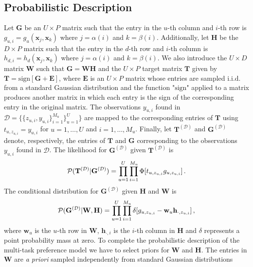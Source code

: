 \subsection{Probabilistic Description}

Let $\mathbf{G}$ be an $U\times P$ matrix such that the entry in the $u$-th column and $i$-th row is 
$g_{u,i}= g_u(\mathbf{x}_j,\mathbf{x}_k)$ where $j=\alpha(i)$ and $k=\beta(i)$.
Additionally, let $\mathbf{H}$ be the $D\times P$ matrix such that the entry in the $d$-th row and $i$-th column is 
$h_{d,i}= h_d(\mathbf{x}_j,\mathbf{x}_k)$ where $j=\alpha(i)$ and $k=\beta(i)$.
We also introduce the $U \times D$ matrix $\mathbf{W}$ such that $\mathbf{G} = \mathbf{W} \mathbf{H}$ and
the $U\times P$ target matrix $\mathbf{T}$ given by $\mathbf{T} = \text{sign}[\mathbf{G} + \mathbf{E}]$,
where $\mathbf{E}$ is an $U \times P$ matrix whose entries are sampled i.i.d. from a standard Gaussian distribution and
the function "$\text{sign}$" applied to a matrix produces another matrix in which each entry is the sign of
the corresponding entry in the original matrix. The observations $y_{u,i}$ found in $\mathcal{D}=\{\{z_{u,i},y_{u,i}\}_{i=1}^{M_u}\}_{u=1}^{U}\}$ are
mapped to the corresponding entries of $\mathbf{T}$ using $t_{u,z_{u,i}} = y_{u,i}$ for $u = 1,\ldots,U$ and $i = 1,\ldots,M_u$.
Finally, let $\mathbf{T}^{(\mathcal{D})}$ and $\mathbf{G}^{(\mathcal{D})}$ denote, respectively, the entries of $\mathbf{T}$ and $\mathbf{G}$
corresponding to the observations $y_{u,i}$ found in $\mathcal{D}$.
The likelihood for $\mathbf{G}^{(\mathcal{D})}$ given $\mathbf{T}^{(\mathcal{D})}$ is
\begin{align}
\mathcal{P}(\mathbf{T}^{(\mathcal{D})}|\mathbf{G}^{(\mathcal{D})}) 
= \prod_{u=1}^U \prod_{i=1}^{M_u} \Phi[t_{u,z_{u,i}} g_{u,z_{u,i}}]\,. \notag
\end{align}
The conditional distribution for $\mathbf{G}^{(\mathcal{D})}$ given $\mathbf{H}$ and $\mathbf{W}$ is
\begin{align}
\mathcal{P}(\mathbf{G}^{(\mathcal{D})}|\mathbf{W},\mathbf{H}) = 
\prod_{u=1}^{U} \prod_{i=1}^{M_u}\delta[g_{u,z_{u,i}}-\mathbf{w}_u\mathbf{h}_{\cdot,z_{u,i}}]\,, \notag
\end{align}
where $\mathbf{w}_u$ is the $u$-th row in $\mathbf{W}$, $\mathbf{h}_{\cdot,i}$ is the $i$-th column in $\mathbf{H}$
and $\delta$ represents a point probability mass at zero.
To complete the probabilistic description of the multi-task preference model
we have to select priors for $\mathbf{W}$ and $\mathbf{H}$. 
The entries in $\mathbf{W}$ are \emph{a priori} sampled independently from standard Gaussian distributions

